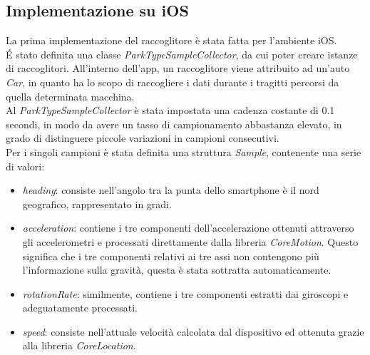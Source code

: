 \subsection{Implementazione su iOS}

La prima implementazione del raccoglitore è stata fatta per l'ambiente iOS.\\
\'E stato definita una classe \emph{ParkTypeSampleCollector}, da cui poter creare
istanze di raccoglitori. All'interno dell'app, un raccoglitore viene attribuito ad
un'auto \emph{Car}, in quanto ha lo scopo di raccogliere i dati durante i tragitti 
percorsi da quella determinata macchina.\\
Al \emph{ParkTypeSampleCollector} è stata impostata una cadenza costante di 0.1
secondi, in modo da avere un tasso di campionamento abbastanza elevato, in grado
di distinguere piccole variazioni in campioni consecutivi.\\
Per i singoli campioni è stata definita una struttura \emph{Sample}, contenente
una serie di valori:
\begin{itemize}
    \item \emph{heading}: consiste nell'angolo tra la punta dello smartphone è il nord geografico,
    rappresentato in gradi.
    \item \emph{acceleration}: contiene i tre componenti dell'accelerazione ottenuti attraverso 
    gli accelerometri e processati direttamente dalla libreria \emph{CoreMotion}. 
    Questo significa che i tre componenti relativi ai tre assi non contengono più
    l'informazione sulla gravità, questa è stata sottratta automaticamente.
    \item \emph{rotationRate}: similmente, contiene i tre componenti estratti dai giroscopi
    e adeguatamente processati.
    \item \emph{speed}: consiste nell'attuale velocità calcolata dal dispositivo ed ottenuta 
    grazie alla libreria \emph{CoreLocation}.
\end{itemize}

